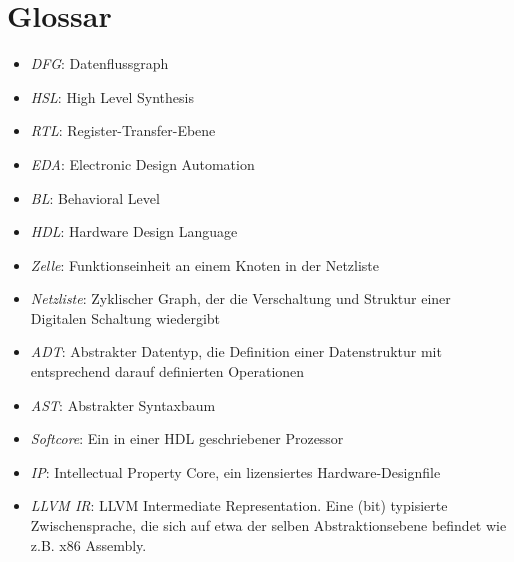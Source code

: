 \documentclass[oneside,a4paper]{article}
\begin{document}
\pagebreak
\section{Glossar}
\begin{itemize}
    \item \emph{DFG}:    Datenflussgraph
    \item \emph{HSL}:    High Level Synthesis
    \item \emph{RTL}:    Register-Transfer-Ebene
    \item \emph{EDA}:    Electronic Design Automation
    \item \emph{BL}:    Behavioral Level
    \item \emph{HDL}:    Hardware Design Language
    \item \emph{Zelle}:    Funktionseinheit an einem Knoten in der Netzliste
    \item \emph{Netzliste}:    Zyklischer Graph, der
      die Verschaltung und Struktur einer Digitalen Schaltung wiedergibt
    \item \emph{ADT}:    Abstrakter Datentyp,
      die Definition einer Datenstruktur mit entsprechend
      darauf definierten Operationen
    \item \emph{AST}:    Abstrakter Syntaxbaum
    \item \emph{Softcore}: Ein in einer HDL geschriebener Prozessor
    \item \emph{IP}: Intellectual Property Core,
      ein lizensiertes Hardware-Designfile
    \item \emph{LLVM IR}: LLVM Intermediate Representation.
      Eine (bit) typisierte Zwischensprache, die sich auf
      etwa der selben Abstraktionsebene befindet wie
      z.B. x86 Assembly.
\end{itemize}

\pagebreak
{}
\listoffigures

\pagebreak
\lstlistoflistings
\end{document}
